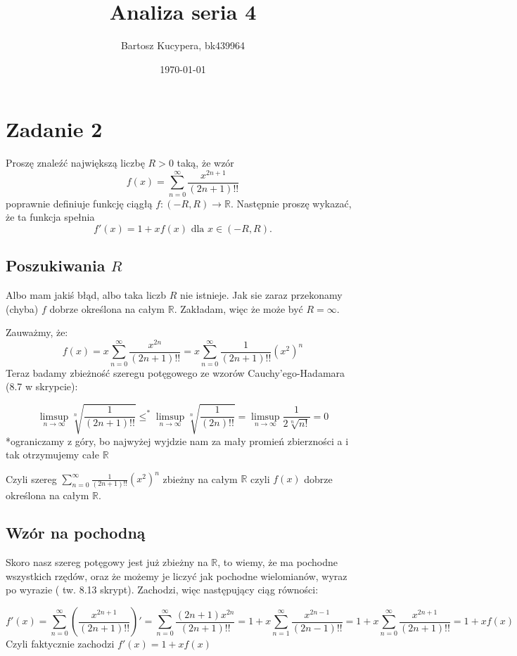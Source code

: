 \documentclass{article}
\title{Analiza seria 4}
\author{Bartosz Kucypera, bk439964}
\date{\today}
\begin{document}
\maketitle

\section*{Zadanie 2}
Proszę znaleźć największą liczbę $R>0$ taką, że wzór
$$f(x) = \sum_{n=0}^{\infty}\frac{x^{2n+1}}{(2n+1)!!}$$
poprawnie definiuje funkcję ciągłą $f:(-R,R) \to \mathbb{R}$. Następnie proszę wykazać, że ta funkcja spełnia
$$f'(x)=1+xf(x) \mbox{ dla } x\in (-R,R).$$

\subsection*{Poszukiwania $R$}
Albo mam jakiś błąd, albo taka liczb $R$ nie istnieje. Jak sie zaraz przekonamy (chyba) $f$ dobrze określona na całym $\mathbb{R}$. Zakładam, więc że może być $R=\infty$.

Zauważmy, że:
$$ f(x) = x\sum_{n=0}^{\infty} \frac{x^{2n}}{(2n+1)!!} = x\sum_{n=0}^{\infty} \frac{1}{(2n+1)!!}(x^2)^n $$
Teraz badamy zbieżność szeregu potęgowego ze wzorów Cauchy'ego-Hadamara (8.7 w skrypcie):

$$ \limsup_{n \to \infty} \sqrt[n]{\frac{1}{(2n+1)!!}} \le^* 
\limsup_{n\to \infty} \sqrt[n]{\frac{1}{(2n)!!}} = \limsup_{n\to \infty} \frac{1}{2\sqrt[n]{n!}} = 0$$
*ograniczamy z góry, bo najwyżej wyjdzie nam za mały promień zbierzności a i tak otrzymujemy całe $\mathbb{R}$ \newline

Czyli szereg $\displaystyle \sum_{n=0}^{\infty} \frac{1}{(2n+1)!!}(x^2)^n$ zbieżny na całym $\mathbb{R}$ czyli $f(x)$ dobrze określona na całym $\mathbb{R}$.

\subsection*{Wzór na pochodną}
Skoro nasz szereg potęgowy jest już zbieżny na $\mathbb{R}$, to wiemy, że ma pochodne wszystkich rzędów, oraz że możemy je liczyć jak pochodne wielomianów, wyraz po wyrazie ( tw. 8.13 skrypt). \newline
Zachodzi, więc następujący ciąg równości:

$$ f'(x)=\sum_{n = 0}^{\infty}\left( \frac{x^{2n+1}}{(2n+1)!!} \right)' = 
\sum_{n=0}^{\infty} \frac{(2n+1)x^{2n}}{(2n+1)!!} = 1 + x\sum_{n=1}^{\infty}\frac{x^{2n-1}}{(2n-1)!!} = 1+x\sum_{n=0}^{\infty}\frac{x^{2n+1}}{(2n+1)!!}=1+xf(x)$$
Czyli faktycznie zachodzi $f'(x) = 1+xf(x)$
\end{document}
